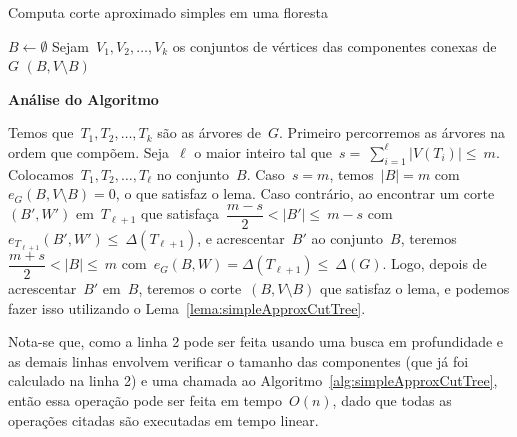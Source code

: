 \documentclass[a4paper,12pt]{article}
\begin{document}
\begin{algorithm}[H]
\label{alg:simpleApproxCutForest}

	\caption{Computa corte aproximado simples em uma floresta}
	$B \gets \emptyset$\;
	Sejam~$V_1, V_2,\ldots, V_k$ os conjuntos de vértices das
	componentes conexas de~$G$\;
	\Return $(B,V\setminus B)$\;

\end{algorithm}	

\bigskip
\bigskip
\bigskip

\textbf{Análise do Algoritmo}

	Temos que~$T_1, T_2, \ldots,T_k$ são 
	as árvores de~$G$. 
	Primeiro percorremos as árvores na ordem que compõem. 
	Seja~$\ell$ o maior inteiro tal 
	que~$s=~\displaystyle\sum_{i=1}^{\ell}|V(T_i)| \le~m$.
	Colocamos~$T_1,T_2, \ldots,T_\ell$ no conjunto~$B$.
	Caso~$s=m$, temos~$|B|=m$ com~$e_G(B,V\setminus B)=0$, o que satisfaz o lema.
	Caso contrário, ao encontrar um corte~$(B',W')$ em~$T_{\ell+1}$ que
	satisfaça~$\dfrac{m-s}{2}<|B'|\le~m-s$ com~$e_{T_{\ell+1}}(B',W') \le~
	\Delta(T_{\ell+1})$, e acrescentar~$B'$ ao conjunto~$B$, 
	teremos~$\dfrac{m+s}{2}<|B| \le~m$ 
	com~$e_G(B,W)=\Delta(T_{\ell+1}) \le~\Delta(G)$.
	Logo, depois de acrescentar~$B'$ em~$B$, teremos o corte~$(B,V\setminus B)$
	que satisfaz o lema, e podemos fazer isso utilizando o 
	Lema~\ref{lema:simpleApproxCutTree}.
	
	Nota-se que, como a linha 2 pode ser feita usando uma
	busca em profundidade e as demais 
	linhas envolvem verificar o tamanho das componentes 
	(que já foi calculado na linha 2) e uma chamada ao
	Algoritmo~\ref{alg:simpleApproxCutTree}, então essa operação pode 
	ser feita em tempo~$O(n)$, dado que todas as operações
	citadas são executadas em tempo linear. 

\bigskip
\bigskip
\bigskip


\end{document}
